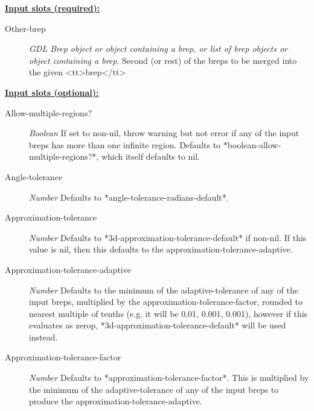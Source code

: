 \documentclass [11pt]{book}
\begin{document}
\begin{itemize}
\begin{description}
\end{description}








\textbf{
\underline{Input slots (required):}}

\begin{description}

\item [Other-brep]
\emph{GDL Brep object or object containing a brep, or list of brep objects or object containing a brep}.
Second (or rest) of the breps to be merged into the given <tt>brep</tt>


\end{description}






\textbf{
\underline{Input slots (optional):}}

\begin{description}

\item [Allow-multiple-regions?]
\emph{Boolean} If set to non-nil, throw warning but not error if any of the input breps has more than
one infinite region. Defaults to *boolean-allow-multiple-regions?*, which itself defaults to nil.


\item [Angle-tolerance]
\emph{Number} Defaults to *angle-tolerance-radians-default*.


\item [Approximation-tolerance]
\emph{Number} Defaults to *3d-approximation-tolerance-default* if non-nil. If this value is nil,
then this defaults to the approximation-tolerance-adaptive.


\item [Approximation-tolerance-adaptive]
\emph{Number} Defaults to the minimum of the adaptive-tolerance of any of the input breps,
multiplied by the approximation-tolerance-factor, rounded to nearest multiple of
tenths (e.g. it will be 0.01, 0.001, 0.001), however if this evaluates as zerop,
*3d-approximation-tolerance-default* will be used instead.


\item [Approximation-tolerance-factor]
\emph{Number} Defaults to *approximation-tolerance-factor*. This is multiplied by  the minimum of the
adaptive-tolerance of any of the input breps to produce the approximation-tolerance-adaptive.



\end{description}
\end{itemize}
\end{document}
